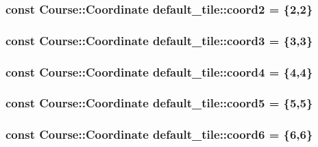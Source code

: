 \hypertarget{classdefault__tile_afe8df9f0be2707e28ca52f2d63a6f565}{
\subsubsection[{coord2}]{\setlength{\rightskip}{0pt plus 5cm}const {\bf Course\-::\-Coordinate} default\-\_\-tile\-::coord2 = \{2,2\}\hspace{0.3cm}{\ttfamily [private]}}}\label{classdefault__tile_afe8df9f0be2707e28ca52f2d63a6f565}
\hypertarget{classdefault__tile_ad831dcb7909d9e7918380ed7ec7f0f8b}{
\subsubsection[{coord3}]{\setlength{\rightskip}{0pt plus 5cm}const {\bf Course\-::\-Coordinate} default\-\_\-tile\-::coord3 = \{3,3\}\hspace{0.3cm}{\ttfamily [private]}}}\label{classdefault__tile_ad831dcb7909d9e7918380ed7ec7f0f8b}
\hypertarget{classdefault__tile_adfe1e7d47661ef24230ed213d6860d0d}{
\subsubsection[{coord4}]{\setlength{\rightskip}{0pt plus 5cm}const {\bf Course\-::\-Coordinate} default\-\_\-tile\-::coord4 = \{4,4\}\hspace{0.3cm}{\ttfamily [private]}}}\label{classdefault__tile_adfe1e7d47661ef24230ed213d6860d0d}
\hypertarget{classdefault__tile_a99eb8e09cd1e8bc821c1d410f0cefcdc}{
\subsubsection[{coord5}]{\setlength{\rightskip}{0pt plus 5cm}const {\bf Course\-::\-Coordinate} default\-\_\-tile\-::coord5 = \{5,5\}\hspace{0.3cm}{\ttfamily [private]}}}\label{classdefault__tile_a99eb8e09cd1e8bc821c1d410f0cefcdc}
\hypertarget{classdefault__tile_a02b5556e362bb56edb63015f8a57aaa1}{
\subsubsection[{coord6}]{\setlength{\rightskip}{0pt plus 5cm}const {\bf Course\-::\-Coordinate} default\-\_\-tile\-::coord6 = \{6,6\}\hspace{0.3cm}{\ttfamily [private]}}}\label{classdefault__tile_a02b5556e362bb56edb63015f8a57aaa1}
